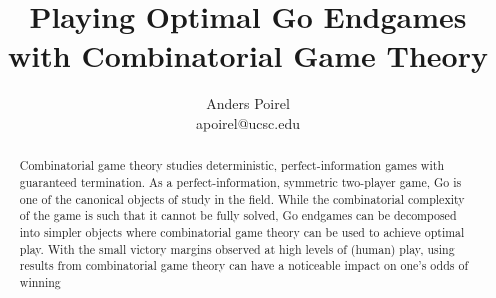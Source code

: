 \documentclass{article}
\title{Playing Optimal Go Endgames with Combinatorial Game Theory}
\author{Anders Poirel \\ apoirel@ucsc.edu}
\date{}
\begin{document}
\maketitle
\begin{abstract}
    Combinatorial game theory studies deterministic, perfect-information 
    games with guaranteed termination. As a perfect-information, symmetric 
    two-player game, Go is one of the canonical objects of study in the field.
    While the combinatorial complexity of the game is such that it cannot be fully solved,
    Go endgames can be decomposed into simpler objects where combinatorial game theory can 
    be used to achieve optimal play. With the small victory margins observed at high
    levels of (human) play, using results from combinatorial game theory can have a 
    noticeable impact on one's odds of winning 
\end{abstract}

\tableofcontents








\end{document}
